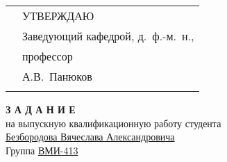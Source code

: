\thispagestyle{empty}



\begin{spacing}{0.9}

\begin{tabularx}{\textwidth}{ XX }
& УТВЕРЖДАЮ \\
& Заведующий кафедрой, д.~ф.-м.~н., \\
& профессор \\
& А.В.~Панюков \\
&  \\
\end{tabularx}

\end{spacing}


\begin{center}
{\bf З А Д А Н И Е} \\
на выпускную квалификационную работу студента \\
\underline{Безбородова Вячеслава Александровича} \\
Группа \underline{ВМИ-413}
\end{center}

